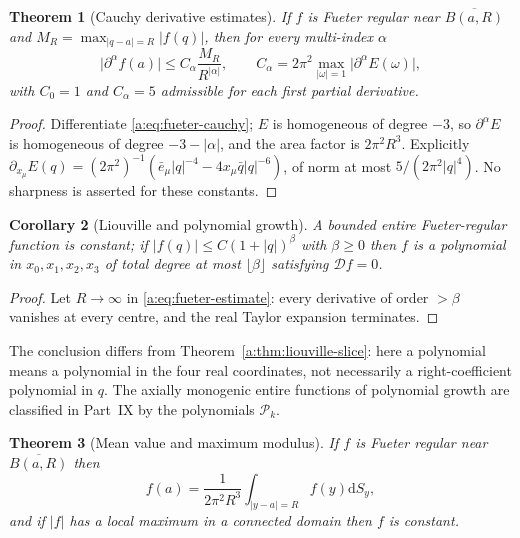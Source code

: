\documentclass[11pt,a4paper]{article}
\numberwithin{equation}{section}
\newtheorem{theorem}{Theorem}[section]
\newtheorem{corollary}[theorem]{Corollary}
\theoremstyle{definition}
\theoremstyle{remark}
\theoremstyle{plain}
\newcommand{\Dop}{\mathcal D}
\newcommand{\abs}[1]{\lvert #1\rvert}
\newcommand{\dd}{\mathrm d}
\begin{document}
\begin{theorem}[Cauchy derivative estimates]
\label{a:thm:fueter-estimates}
If $f$ is Fueter regular near $\overline{B(a,R)}$ and
$M_R=\max_{\abs{q-a}=R}\abs{f(q)}$, then for every multi-index $\alpha$
\begin{equation}
 \abs{\partial^\alpha f(a)}\le C_\alpha\frac{M_R}{R^{\abs\alpha}},
 \qquad C_\alpha=2\pi^2\max_{\abs\omega=1}\abs{\partial^\alpha E(\omega)},
 \label{a:eq:fueter-estimate}
\end{equation}
with $C_0=1$ and $C_\alpha=5$ admissible for each first partial derivative.
\end{theorem}

\begin{proof}
Differentiate \eqref{a:eq:fueter-cauchy}; $E$ is homogeneous of degree $-3$,
so $\partial^\alpha E$ is homogeneous of degree $-3-\abs\alpha$, and the area
factor is $2\pi^2R^3$. Explicitly
$\partial_{x_\mu}E(q)=(2\pi^2)^{-1}(\bar e_\mu\abs q^{-4}
-4x_\mu\bar q\abs q^{-6})$, of norm at most $5/(2\pi^2\abs q^4)$. No
sharpness is asserted for these constants.
\end{proof}

\begin{corollary}[Liouville and polynomial growth]
\label{a:cor:fueter-liouville}
A bounded entire Fueter-regular function is constant; if
$\abs{f(q)}\le C(1+\abs q)^\beta$ with $\beta\ge0$ then $f$ is a polynomial in
$x_0,x_1,x_2,x_3$ of total degree at most $\lfloor\beta\rfloor$ satisfying
$\Dop f=0$.
\end{corollary}

\begin{proof}
Let $R\to\infty$ in \eqref{a:eq:fueter-estimate}: every derivative of order
$>\beta$ vanishes at every centre, and the real Taylor expansion terminates.
\end{proof}

The conclusion differs from Theorem~\ref{a:thm:liouville-slice}: here a
polynomial means a polynomial in the four real coordinates, not necessarily a
right-coefficient polynomial in $q$. The axially monogenic entire functions of
polynomial growth are classified in Part~IX by the polynomials
$\mathcal P_k$.

\begin{theorem}[Mean value and maximum modulus]
\label{a:thm:fueter-max}
If $f$ is Fueter regular near $\overline{B(a,R)}$ then
\begin{equation}
 f(a)=\frac1{2\pi^2R^3}\int_{\abs{y-a}=R}f(y)\dd S_y ,
 \label{a:eq:fueter-mean}
\end{equation}
and if $\abs f$ has a local maximum in a connected domain then $f$ is
constant.
\end{theorem}
\end{document}
